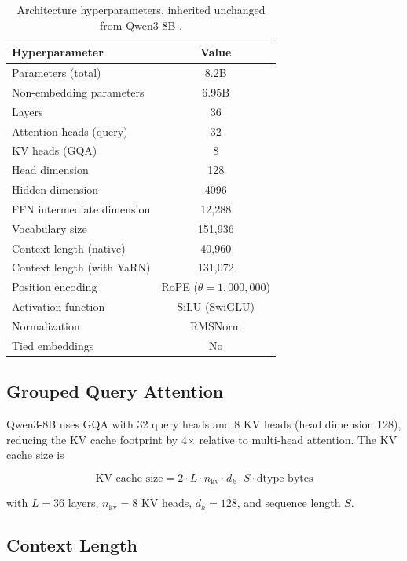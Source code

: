 \documentclass[11pt,a4paper]{article}
\begin{document}
\begin{table}[H]
\centering
\caption{Architecture hyperparameters, inherited unchanged from Qwen3-8B \cite{qwen3hf}.}
\label{tab:arch}
\begin{tabular}{lc}
\toprule
\textbf{Hyperparameter} & \textbf{Value} \\
\midrule
Parameters (total)           & 8.2B \\
Non-embedding parameters     & 6.95B \\
Layers                       & 36 \\
Attention heads (query)      & 32 \\
KV heads (GQA)               & 8 \\
Head dimension               & 128 \\
Hidden dimension             & 4096 \\
FFN intermediate dimension   & 12{,}288 \\
Vocabulary size              & 151{,}936 \\
Context length (native)      & 40{,}960 \\
Context length (with YaRN)   & 131{,}072 \\
Position encoding            & RoPE ($\theta = 1{,}000{,}000$) \\
Activation function          & SiLU (SwiGLU) \\
Normalization                & RMSNorm \\
Tied embeddings              & No \\
\bottomrule
\end{tabular}
\end{table}

\subsection{Grouped Query Attention}

Qwen3-8B uses GQA \cite{ainslie2023gqa} with 32 query heads and 8 KV heads (head dimension 128),
reducing the KV cache footprint by 4$\times$ relative to multi-head attention. The KV cache size is

\begin{equation}
  \text{KV cache size} = 2 \cdot L \cdot n_{\text{kv}} \cdot d_k \cdot S \cdot \text{dtype\_bytes}
\end{equation}

with $L=36$ layers, $n_{\text{kv}}=8$ KV heads, $d_k=128$, and sequence length $S$.

\subsection{Context Length}
\end{document}
